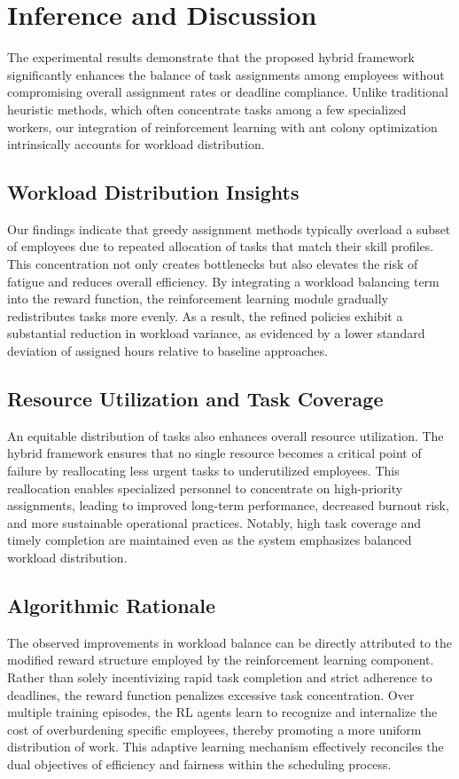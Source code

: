 \documentclass[%
aip,
cp,  %
amsmath,amssymb,
reprint,%
]{revtex4-2}
\begin{document}
	\section{\label{sec:inference}Inference and Discussion}
	The experimental results demonstrate that the proposed hybrid framework significantly
	enhances the balance of task assignments among employees without compromising overall
	assignment rates or deadline compliance. Unlike traditional heuristic methods,
	which often concentrate tasks among a few specialized workers, our integration
	of reinforcement learning with ant colony optimization intrinsically accounts
	for workload distribution.
	
	\subsection{\label{subsec:workload}Workload Distribution Insights}
	Our findings indicate that greedy assignment methods typically overload a
	subset of employees due to repeated allocation of tasks that match their skill
	profiles. This concentration not only creates bottlenecks but also elevates the
	risk of fatigue and reduces overall efficiency. By integrating a workload
	balancing term into the reward function, the reinforcement learning module gradually
	redistributes tasks more evenly. As a result, the refined policies exhibit a substantial
	reduction in workload variance, as evidenced by a lower standard deviation of
	assigned hours relative to baseline approaches.
	
	\subsection{\label{subsec:resource}Resource Utilization and Task Coverage}
	An equitable distribution of tasks also enhances overall resource utilization.
	The hybrid framework ensures that no single resource becomes a critical point of
	failure by reallocating less urgent tasks to underutilized employees. This
	reallocation enables specialized personnel to concentrate on high-priority
	assignments, leading to improved long-term performance, decreased burnout risk,
	and more sustainable operational practices. Notably, high task coverage and timely
	completion are maintained even as the system emphasizes balanced workload distribution.
	
	\subsection{\label{subsec:rationale}Algorithmic Rationale}
	The observed improvements in workload balance can be directly attributed to the
	modified reward structure employed by the reinforcement learning component.
	Rather than solely incentivizing rapid task completion and strict adherence to
	deadlines, the reward function penalizes excessive task concentration. Over
	multiple training episodes, the RL agents learn to recognize and internalize the
	cost of overburdening specific employees, thereby promoting a more uniform
	distribution of work. This adaptive learning mechanism effectively reconciles the
	dual objectives of efficiency and fairness within the scheduling process.
	
\end{document}
